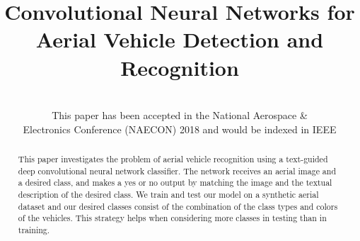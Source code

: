 \documentclass[conference]{IEEEtran}
\begin{document}
%

\title{Convolutional Neural Networks for Aerial Vehicle Detection and Recognition}



\author{
\\
This paper has been accepted in the National Aerospace &\\ Electronics Conference (NAECON) 2018 and would be indexed in IEEE}






\maketitle

\begin{abstract}
This paper investigates the problem of aerial vehicle recognition using a text-guided deep convolutional neural network classifier. The network receives an aerial image and a desired class, and makes a yes or no output by matching the image and the textual description of the desired class. We train and test our model on a synthetic aerial dataset and our desired classes consist of the combination of the class types and colors of the vehicles. This strategy helps when considering more classes in testing than in training.
\\\\
\end{abstract}
\end{document}
